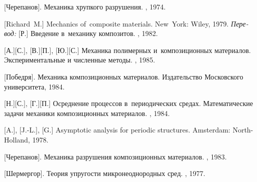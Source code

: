 \begin{thebibliography}{123}
\begin{otherlanguage}{russian}
[Черепанов].
Механика хрупкого разрушения.
\naukapublisher, 1974.

%
%



[Richard~M.] Mechanics of~composite materials. New~York: Wiley, 1979. 
\emph{Перевод:} [Р.] Введение в~механику композитов. \mirpublisher, 1982. 

[А.][С.], [В.][П.], [Ю.][С.] Механика полимерных и~композиционных материалов. Экспериментальные и численные методы. \naukapublisher, 1985. 

[Победря].
Механика композиционных материалов.
Издательство Московского университета,
1984.

[Н.][С.], [Г.][П.] Осреднение процессов в~периодических средах. Математические задачи механики композиционных материалов. \naukapublisher, 1984. 

[A.], %
[J.-L.], %
[G.]
Asymptotic analysis for periodic structures.
Amsterdam: North\hbox{-}Holland,
1978.

[Черепанов].
Механика разрушения композиционных материалов.
\naukapublisher,
1983.

[Шермергор].
Теория упругости микронеоднородных сред.
\naukapublisher,
1977.


\end{otherlanguage}
\end{thebibliography}
